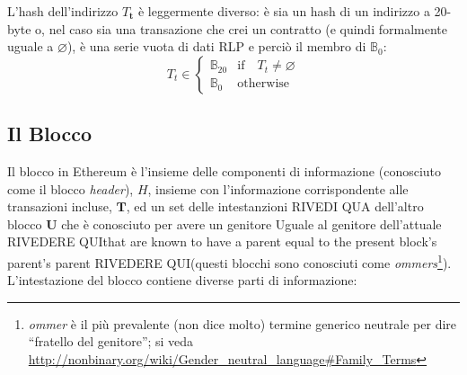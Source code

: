 \documentclass[9pt,oneside]{amsart}
\begin{document}
\begin{multicols}{2}
L'hash dell'indirizzo $T_\mathbf{t}$ è leggermente diverso: è sia un hash di un indirizzo a 20-byte o, nel caso sia una transazione che crei un contratto (e quindi formalmente uguale a $\varnothing$), è una serie vuota di dati RLP e perciò il membro di $\mathbb{B}_0$:
\begin{equation}
T_t \in \begin{cases} \mathbb{B}_{20} & \text{if} \quad T_t \neq \varnothing \\
\mathbb{B}_{0} & \text{otherwise}\end{cases}
\end{equation}

\subsection{Il Blocco} \label{ch:block}

Il blocco in Ethereum è l'insieme delle componenti di informazione (conosciuto come il blocco \textit{header}), $H$, insieme con l'informazione corrispondente alle transazioni incluse, $\mathbf{T}$, ed un set delle intestanzioni RIVEDI QUA dell'altro blocco $\mathbf{U}$ che è conosciuto per avere un genitore Uguale al genitore dell'attuale RIVEDERE QUIthat are known to have a parent equal to the present block's parent's parent RIVEDERE QUI(questi blocchi sono conosciuti come \textit{ommers}\footnote{\textit{ommer} è il più prevalente (non dice molto) termine generico neutrale per dire ``fratello del genitore''; si veda \url{http://nonbinary.org/wiki/Gender_neutral_language#Family_Terms}}). L'intestazione del blocco contiene diverse parti di informazione:



\end{multicols}
\end{document}
